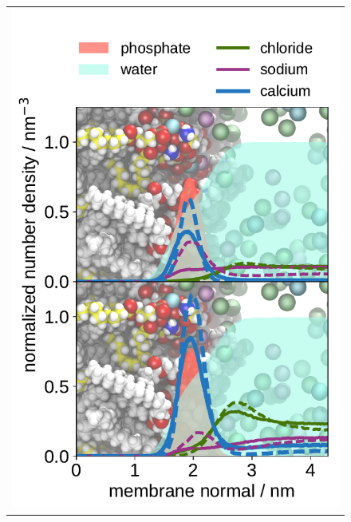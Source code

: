 \documentclass[journal=jpcbfk,manuscript=article]{achemso}
\newlength{\figheightsmall}
\newlength{\figheight}
\begin{document}
\begin{figure}[tbp!] 
  \centering 
  \begin{tabular}{ c }
  \includegraphics[height=1.5\figheightsmall]{../img/ecc_pops/density_profiles_ca_na_k_cl_wat_phos_ecclipids_lipid17_compar_80and200mMCaCl2.pdf}

\end{tabular}
\end{figure}
\end{document}
